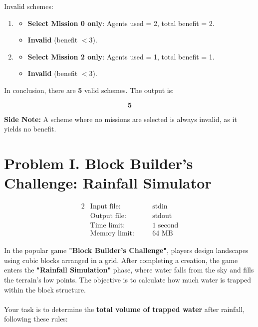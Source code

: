 \documentclass[12pt,a4paper]{article}
\begin{document}
\noindent
Invalid schemes:
\begin{enumerate}
    \item \begin{itemize}
        \item \textbf{Select Mission 0 only}: Agents used = 2, total benefit = 2. 
        \item \textbf{Invalid} (benefit \( < 3 \)).
    \end{itemize}
    \item \begin{itemize}
        \item \textbf{Select Mission 2 only}: Agents used = 1, total benefit = 1. 
        \item \textbf{Invalid} (benefit \( < 3 \)).
    \end{itemize}
\end{enumerate}

\noindent
In conclusion, there are \textbf{5} valid schemes. The output is:

\[
\mathbf{5}
\]

\noindent
\textbf{Side Note:} A scheme where no missions are selected is always invalid, as it yields no benefit.

\newpage

\section*{\fontsize{18}{12}Problem I. Block Builder's Challenge: Rainfall Simulator}

\begin{alignat*} {2}
 &   \text{Input file:}   \quad     &&\text{stdin}\\
 &   \text{Output file:}  \quad     &&\text{stdout}\\
 &   \text{Time limit:}   \quad     &&\text{1 second}\\
 &   \text{Memory limit:} \quad     &&\text{64 MB}
\end{alignat*}

\noindent
In the popular game \textbf{"Block Builder's Challenge"}, players design landscapes using cubic blocks arranged in a grid. After completing a creation, the game enters the \textbf{"Rainfall Simulation"} phase, where water falls from the sky and fills the terrain's low points. The objective is to calculate how much water is trapped within the block structure.
\\\\
\noindent
Your task is to determine the \textbf{total volume of trapped water} after rainfall, following these rules:
\end{document}
